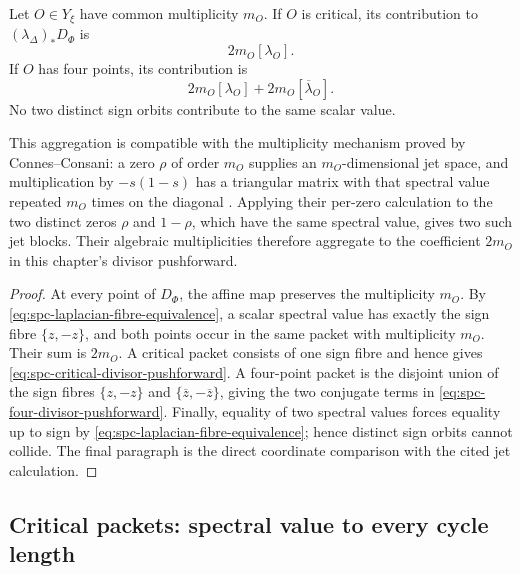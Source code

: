 \begin{corollary}
\label{cor:spc-divisor-pushforward}
Let \(O\in Y_\xi\) have common multiplicity \(m_O\).
If \(O\) is critical, its contribution to
\((\lambda_\Delta)_*D_\Phi\) is
\begin{equation}
\label{eq:spc-critical-divisor-pushforward}
 2m_O[\lambda_O].
\end{equation}
If \(O\) has four points, its contribution is
\begin{equation}
\label{eq:spc-four-divisor-pushforward}
 2m_O[\lambda_O]+2m_O[\overline\lambda_O].
\end{equation}
No two distinct sign orbits contribute to the same scalar value.

This aggregation is compatible with the multiplicity mechanism proved by
Connes--Consani: a zero \(\rho\) of order \(m_O\) supplies an
\(m_O\)-dimensional jet space, and multiplication by \(-s(1-s)\) has a
triangular matrix with that spectral value repeated \(m_O\) times on the
diagonal \cite[proof of Prop.~4.2]{connesConsani2023Hochschild}.  Applying
their per-zero calculation to the two distinct zeros \(\rho\) and
\(1-\rho\), which have the same spectral value, gives two such jet blocks.
Their algebraic multiplicities therefore aggregate to the coefficient
\(2m_O\) in this chapter's divisor pushforward.
\end{corollary}

\begin{proof}
At every point of \(D_\Phi\), the affine map preserves the multiplicity
\(m_O\).  By \eqref{eq:spc-laplacian-fibre-equivalence}, a scalar spectral
value has exactly the sign fibre \(\{z,-z\}\), and both points occur in the
same packet with multiplicity \(m_O\).  Their sum is \(2m_O\).  A critical
packet consists of one sign fibre and hence gives
\eqref{eq:spc-critical-divisor-pushforward}.  A four-point packet is the
disjoint union of the sign fibres
\(\{z,-z\}\) and \(\{\overline z,-\overline z\}\), giving the two conjugate
terms in \eqref{eq:spc-four-divisor-pushforward}.  Finally, equality of two
spectral values forces equality up to sign by
\eqref{eq:spc-laplacian-fibre-equivalence}; hence distinct sign orbits cannot
collide.  The final paragraph is the direct coordinate comparison with the
cited jet calculation.
\end{proof}

\subsection{Critical packets: spectral value to every cycle length}


